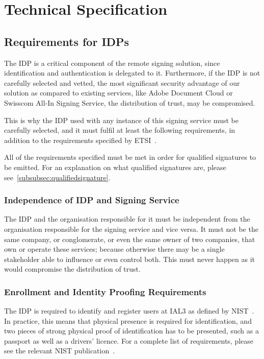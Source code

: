 \chapter{Technical Specification}\label{ch:technical-specification}
\section{Requirements for IDPs}\label{sec:requirements-for-idps}
The \gls{IDP} is a critical component of the remote signing solution,
since identification and authentication is delegated to it.
Furthermore, if the \gls{IDP} is not carefully selected and vetted,
the most significant security advantage of our solution as compared to existing services,
like Adobe Document Cloud or Swisscom All-In Signing Service,
the distribution of trust,
may be compromised.

This is why the \gls{IDP} used with any instance of this signing service must be carefully selected,
and it must fulfil at least the following requirements,
in addition to the requirements specified by \gls{ETSI}~\cite{etsicarequirements}.

All of the requirements specified must be met in order for qualified signatures to be emitted.
For an explanation on what qualified signatures are, please see~\ref{subsubsec:qualifiedsignature}.

\subsection{Independence of IDP and Signing Service}\label{subsec:organisational-and-financial-independence}
The \gls{IDP} and the organisation responsible for it must be independent from the organisation responsible for the signing service and vice versa.
It must not be the same company, or conglomerate, or even the same owner of two companies,
that own or operate these services;
because otherwise there may be a single stakeholder able to influence or even control both.
This must never happen as it would compromise the distribution of trust.

\subsection{Enrollment and Identity Proofing Requirements}\label{subsec:enrollment-and-identity-proofing-requirements}
The \gls{IDP} is required to identify and register users at \gls{IAL3} as defined by \gls{NIST}~\cite{nistregister}.
In practice, this means that physical presence is required for identification,
and two pieces of strong physical proof of identification has to be presented,
such as a passport as well as a drivers' licence.
For a complete list of requirements, please see the relevant \gls{NIST} publication~\cite{nistregister}.

